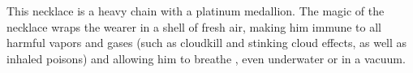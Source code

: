 {%
 This necklace is a heavy chain with a platinum medallion. The magic of the necklace wraps the wearer in a shell of fresh air, making him immune to all harmful vapors and gases (such as cloudkill and stinking cloud effects, as well as inhaled poisons) and allowing him to breathe , even underwater or in a vacuum.


\begin{comment}
Necklace of Fireballs} This device appears to be nothing but beads on a string, sometimes with the ends tied together to form a necklace. (It does not count as an item worn around the neck for the purpose of determining which of a character's worn magic items is effective.) If a character holds it, however, all can see the strand as it really is - a golden chain from which hang a number of golden spheres. The spheres are detachable by the wearer (and only by the wearer), who can easily hurl one of them up to 70 feet. When a sphere arrives at the end of its trajectory, it detonates as a fireball spell (Reflex DC 14 half ).

Spheres come in different strengths, ranging from those that deal 2d6 points of fire damage to those that deal 10d6. The market price of a sphere is 150 gp for each die of damage it deals.

Each necklace of fireballs contains a combination of spheres of various strengths. Some traditional combinations, designated types I through VII, are detailed below.

Necklace & 10d6 & 9d6 & 8d6 & 7d6 & 6d6 & 5d6 & 4d6 & 3d6 & 2d6 & Market Price \\
Type I &  -  &  -  &  -  &  -  &  -  & 1 &  -  & 2 &  -  & 1,650 gp \\
Type II &  -  &  -  &  -  &  -  & 1 &  -  & 2 &  -  & 2 & 2,700 gp \\
Type III &  -  &  -  &  -  & 1 &  -  & 2 &  -  & 4 &  -  & 4,350 gp \\
Type IV &  -  &  -  & 1 &  -  & 2 &  -  & 2 &  -  & 4 & 5,400 gp \\
Type V &  -  & 1 &  -  & 2 &  -  & 2 &  -  & 2 &  -  & 5,850 gp \\
Type VI & 1 &  -  & 2 &  -  & 2 &  -  & 4 &  -  &  -  & 8,100 gp \\
Type VII & 1 & 2 &  -  & 2 &  -  & 2 &  -  & 2 &  -  & 8,700 gp &


\end{comment}}
